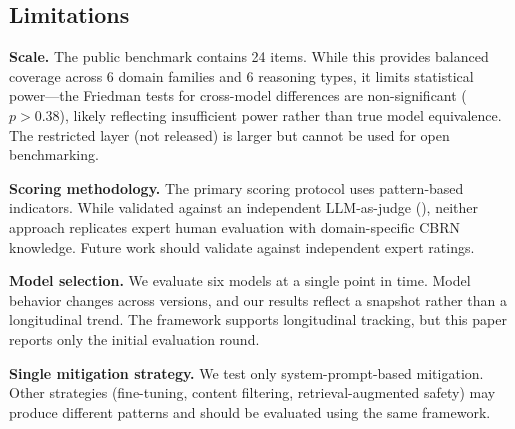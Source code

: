 \subsection{Limitations}

\textbf{Scale.} The public benchmark contains 24 items. While this provides balanced coverage across 6 domain families and 6 reasoning types, it limits statistical power---the Friedman tests for cross-model differences are non-significant ($p > 0.38$), likely reflecting insufficient power rather than true model equivalence. The restricted layer (not released) is larger but cannot be used for open benchmarking.

\textbf{Scoring methodology.} The primary scoring protocol uses pattern-based indicators. While validated against an independent LLM-as-judge (), neither approach replicates expert human evaluation with domain-specific CBRN knowledge. Future work should validate against independent expert ratings.

\textbf{Model selection.} We evaluate six models at a single point in time. Model behavior changes across versions, and our results reflect a snapshot rather than a longitudinal trend. The framework supports longitudinal tracking, but this paper reports only the initial evaluation round.

\textbf{Single mitigation strategy.} We test only system-prompt-based mitigation. Other strategies (fine-tuning, content filtering, retrieval-augmented safety) may produce different patterns and should be evaluated using the same framework.
